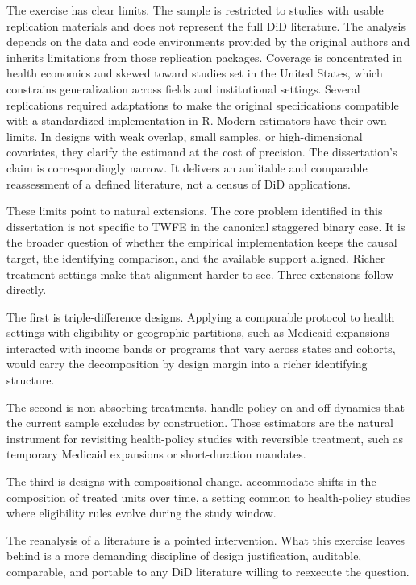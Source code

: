 The exercise has clear limits. The sample is restricted to studies with usable replication materials and does not represent the full DiD literature. The analysis depends on the data and code environments provided by the original authors and inherits limitations from those replication packages. Coverage is concentrated in health economics and skewed toward studies set in the United States, which constrains generalization across fields and institutional settings. Several replications required adaptations to make the original specifications compatible with a standardized implementation in R. Modern estimators have their own limits. In designs with weak overlap, small samples, or high-dimensional covariates, they clarify the estimand at the cost of precision. The dissertation's claim is correspondingly narrow. It delivers an auditable and comparable reassessment of a defined literature, not a census of DiD applications.

These limits point to natural extensions. The core problem identified in this dissertation is not specific to TWFE in the canonical staggered binary case. It is the broader question of whether the empirical implementation keeps the causal target, the identifying comparison, and the available support aligned. Richer treatment settings make that alignment harder to see. Three extensions follow directly.

The first is triple-difference designs. Applying a comparable protocol to health settings with eligibility or geographic partitions, such as Medicaid expansions interacted with income bands or programs that vary across states and cohorts, would carry the decomposition by design margin into a richer identifying structure.

The second is non-absorbing treatments. \textcite{dechaisemartin2020twfe} handle policy on-and-off dynamics that the current sample excludes by construction. Those estimators are the natural instrument for revisiting health-policy studies with reversible treatment, such as temporary Medicaid expansions or short-duration mandates.

The third is designs with compositional change. \textcite{sant2026difference} accommodate shifts in the composition of treated units over time, a setting common to health-policy studies where eligibility rules evolve during the study window.

The reanalysis of a literature is a pointed intervention. What this exercise leaves behind is a more demanding discipline of design justification, auditable, comparable, and portable to any DiD literature willing to reexecute the question.